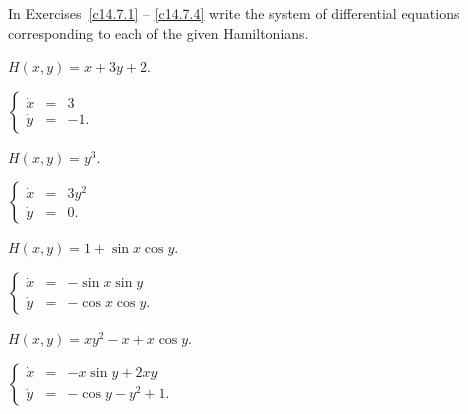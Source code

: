 \documentclass{ximera}
\begin{document}
\begin{solution}


\end{solution}

\noindent In Exercises~\ref{c14.7.1} -- \ref{c14.7.4} write the system of 
differential equations corresponding to each of the given Hamiltonians. 
\begin{exercise} \label{c14.7.1}
$H(x,y) = x+3y+2$.

\begin{solution}
\ans $\left\{\begin{array}{rcl}
	\dot{x} & = & 3 \\ \dot{y} & = & -1. \end{array}\right.$


\end{solution}
\end{exercise}
\begin{exercise} \label{c14.7.2}
$H(x,y) = y^3$.

\begin{solution}
\ans $\left\{\begin{array}{rcl}
	\dot{x} & = & 3y^2 \\ \dot{y} & = & 0. \end{array}\right.$

\end{solution}
\end{exercise}
\begin{exercise} \label{c14.7.3}
$H(x,y) = 1 + \sin x \cos y$.

\begin{solution}
\ans $\left\{\begin{array}{rcl}
\dot{x} & = & -\sin x\sin y \\ \dot{y} & = & -\cos x\cos y. \end{array}\right.$

\end{solution}
\end{exercise}
\begin{exercise} \label{c14.7.4}
$H(x,y) = xy^2 - x + x\cos y$.

\begin{solution}
\ans $\left\{\begin{array}{rcl}
\dot{x} & = & -x\sin y + 2xy \\ \dot{y} & = & -\cos y -y^2 +1. \end{array}\right.$


\end{solution}
\end{exercise}
\end{document}
